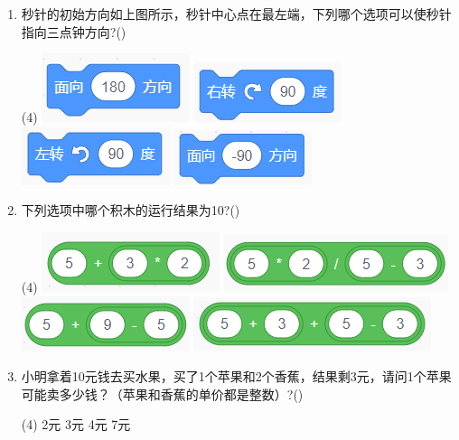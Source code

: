 \documentclass[10pt, a4paper]{article}
\begin{document}
\begin{enumerate}
        \item 秒针的初始方向如上图所示，秒针中心点在最左端，下列哪个选项可以使秒针指向三点钟方向?(\qquad)
        \begin{tasks}(4)
            \task \includegraphics[width=.13\textwidth]{9a.png}
            \task \includegraphics[width=.13\textwidth]{9b.png}
            \task \includegraphics[width=.13\textwidth]{9c.png}
            \task \includegraphics[width=.13\textwidth]{9d.png}
        \end{tasks}

        \item 下列选项中哪个积木的运行结果为10?(\qquad)
        \begin{tasks}(4)
            \task \includegraphics[width=.13\textwidth]{10a.png}
            \task \includegraphics[width=.18\textwidth]{10b.png}
            \task \includegraphics[width=.13\textwidth]{10c.png}
            \task \includegraphics[width=.18\textwidth]{10d.png}
        \end{tasks}

        \item 小明拿着10元钱去买水果，买了1个苹果和2个香蕉，结果剩3元，请问1个苹果可能卖多少钱？（苹果和香蕉的单价都是整数）?(\qquad)
        \begin{tasks}(4)
            \task 2元
            \task 3元
            \task 4元
            \task 7元
        \end{tasks}


\end{enumerate}
\end{document}
